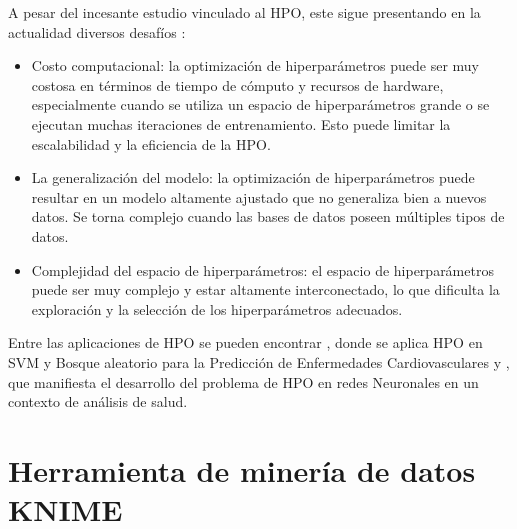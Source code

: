 A pesar del incesante estudio vinculado al HPO, este sigue presentando en la actualidad diversos desafíos \citep{hutter2019automated}:
\begin{itemize}
	\item Costo computacional: la optimización de hiperparámetros puede ser muy costosa en términos de tiempo de cómputo y recursos de hardware, especialmente cuando se utiliza un espacio de hiperparámetros grande o se ejecutan muchas iteraciones de entrenamiento. Esto puede limitar la escalabilidad y la eficiencia de la HPO.
	\item La generalización del modelo: la optimización de hiperparámetros puede resultar en un modelo altamente ajustado que no generaliza bien a nuevos datos. Se torna complejo cuando las bases de datos poseen múltiples tipos de datos.
	\item Complejidad del espacio de hiperparámetros: el espacio de hiperparámetros puede ser muy complejo y estar altamente interconectado, lo que dificulta la exploración y la selección de los hiperparámetros adecuados.
\end{itemize}
Entre las aplicaciones de HPO se pueden encontrar \citep{hernandeztecnicas}, donde se aplica HPO en SVM y Bosque aleatorio para la Predicción de Enfermedades Cardiovasculares y \citep{waring2020automated}, que manifiesta el desarrollo del problema de HPO en redes Neuronales en un contexto de análisis de salud.
 
\section{Herramienta de minería de datos KNIME}

